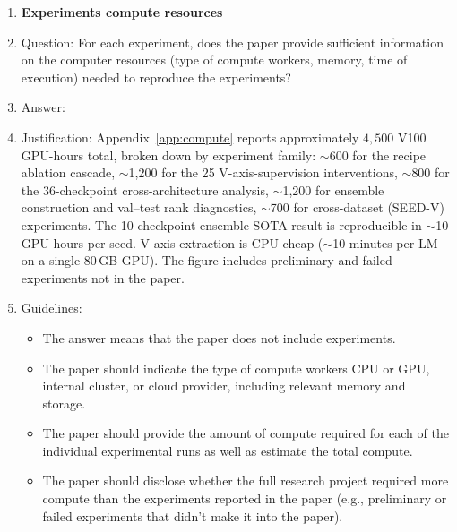 \begin{enumerate}
\item {\bf Experiments compute resources}
    \item[] Question: For each experiment, does the paper provide sufficient information on the computer resources (type of compute workers, memory, time of execution) needed to reproduce the experiments?
    \item[] Answer: \answerYes{}
    \item[] Justification: Appendix~\ref{app:compute} reports approximately $4{,}500$ V100 GPU-hours total, broken down by experiment family: $\sim$600 for the recipe ablation cascade, $\sim$1{,}200 for the 25 V-axis-supervision interventions, $\sim$800 for the 36-checkpoint cross-architecture analysis, $\sim$1{,}200 for ensemble construction and val--test rank diagnostics, $\sim$700 for cross-dataset (SEED-V) experiments. The 10-checkpoint ensemble SOTA result is reproducible in $\sim$10 GPU-hours per seed. V-axis extraction is CPU-cheap ($\sim$10 minutes per LM on a single 80\,GB GPU). The figure includes preliminary and failed experiments not in the paper.
    \item[] Guidelines:
    \begin{itemize}
        \item The answer \answerNA{} means that the paper does not include experiments.
        \item The paper should indicate the type of compute workers CPU or GPU, internal cluster, or cloud provider, including relevant memory and storage.
        \item The paper should provide the amount of compute required for each of the individual experimental runs as well as estimate the total compute.
        \item The paper should disclose whether the full research project required more compute than the experiments reported in the paper (e.g., preliminary or failed experiments that didn't make it into the paper).
    \end{itemize}


\end{enumerate}
